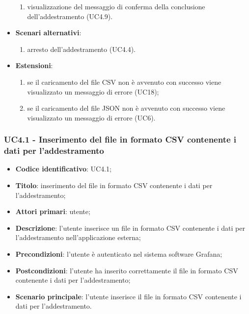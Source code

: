 \begin{itemize}
\begin{enumerate}
            \item visualizzazione del messaggio di conferma della conclusione dell'addestramento (UC4.9). 
        \end{enumerate}
    \item \textbf{Scenari alternativi}:
    \begin{enumerate}
    	\item arresto dell'addestramento (UC4.4).
    \end{enumerate}
    \item \textbf{Estensioni}:
    \begin{enumerate}
    	\item se il caricamento del file CSV non è avvenuto con successo viene visualizzato un messaggio di errore (UC18);
    	\item se il caricamento del file JSON non è avvenuto con successo viene visualizzato un messaggio di errore (UC6).
    \end{enumerate}
\end{itemize}

\subsubsection{UC4.1 - Inserimento del file in formato CSV contenente i dati per l'addestramento}
\begin{itemize}
    \item \textbf{Codice identificativo}: UC4.1;
    \item \textbf{Titolo}: inserimento del file in formato CSV contenente i dati per l'addestramento;
    \item \textbf{Attori primari}: utente;
    \item \textbf{Descrizione}: l'utente inserisce un file in formato CSV contenente i dati per l'addestramento nell'applicazione esterna;
    \item \textbf{Precondizioni}: l'utente è autenticato nel sistema software Grafana\glo;
    \item \textbf{Postcondizioni}: l'utente ha inserito correttamente il file in formato CSV contenente i dati per l'addestramento;
    \item \textbf{Scenario principale}: l'utente inserisce il file in formato CSV contenente i dati per l'addestramento.
\end{itemize}
